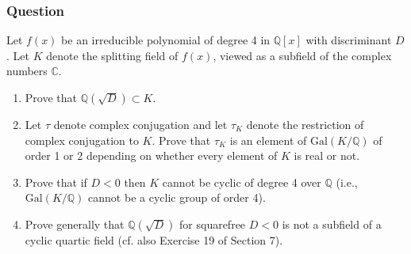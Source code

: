 \documentclass[10pt]{article}
\begin{document}
\subsubsection{Question}
Let $f(x)$ be an irreducible polynomial of degree 4 in $\mathbb{Q}[x]$ with discriminant $D$. Let $K$ denote the splitting field of $f(x)$, viewed as a subfield of the complex numbers $\mathbb{C}$.
\begin{enumerate}
\item Prove that $\mathbb{Q}(\sqrt D) \subset K$.
\item Let $\tau$ denote complex conjugation and let $\tau_K$ denote the restriction of complex conjugation to $K$. Prove that $\tau_K$ is an element of $\mathrm{Gal}(K/\mathbb{Q})$ of order 1 or 2 depending on whether every element of $K$ is real or not.
\item Prove that if $D<0$ then $K$ cannot be cyclic of degree 4 over $\mathbb{Q}$ (i.e., $\mathrm{Gal}(K/\mathbb{Q})$ cannot be a cyclic group of order 4).
\item Prove generally that $\mathbb{Q}(\sqrt D )$ for squarefree $D <0$ is not a subfield of a cyclic quartic field (cf. also Exercise 19 of Section 7).
\end{enumerate}
\end{document}
